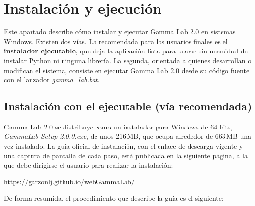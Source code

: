 \documentclass[11pt,a4paper]{article}
\newcounter{captura}
\begin{document}
\clearpage

\section{Instalaci\'on y ejecuci\'on}

Este apartado describe c\'omo instalar y ejecutar Gamma Lab 2.0 en sistemas Windows. Existen dos v\'ias. La recomendada para los usuarios finales es el \textbf{instalador ejecutable}, que deja la aplicaci\'on lista para usarse sin necesidad de instalar Python ni ninguna librer\'ia. La segunda, orientada a quienes desarrollan o modifican el sistema, consiste en ejecutar Gamma Lab 2.0 desde su c\'odigo fuente con el lanzador \textit{gamma\_lab.bat}.

    \subsection{Instalaci\'on con el ejecutable (v\'ia recomendada)}
    \label{sec:mu_instalador}
    Gamma Lab 2.0 se distribuye como un instalador para Windows de 64 bits, \textit{GammaLab-Setup-2.0.0.exe}, de unos 216\,MB, que ocupa alrededor de 663\,MB una vez instalado. La gu\'ia oficial de instalaci\'on, con el enlace de descarga vigente y una captura de pantalla de cada paso, est\'a publicada en la siguiente p\'agina, a la que debe dirigirse el usuario para realizar la instalaci\'on:

    \begin{center}\url{https://garzonlj.github.io/webGammaLab/}\end{center}

    De forma resumida, el procedimiento que describe la gu\'ia es el siguiente:
\end{document}
